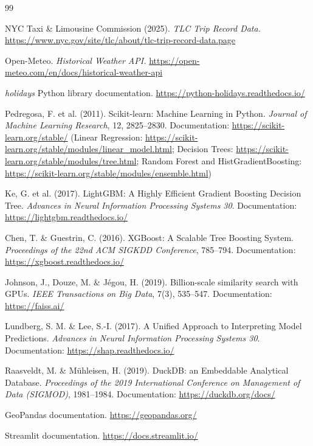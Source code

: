 \documentclass[12pt,a4paper]{article}
\begin{document}
\begin{thebibliography}{99}

 NYC Taxi \& Limousine Commission (2025). \emph{TLC Trip Record Data.} \url{https://www.nyc.gov/site/tlc/about/tlc-trip-record-data.page}

 Open-Meteo. \emph{Historical Weather API.} \url{https://open-meteo.com/en/docs/historical-weather-api}

 \emph{holidays} Python library documentation. \url{https://python-holidays.readthedocs.io/}

 Pedregosa, F. et al. (2011). Scikit-learn: Machine Learning in Python. \emph{Journal of Machine Learning Research}, 12, 2825--2830. Documentation: \url{https://scikit-learn.org/stable/} (Linear Regression: \url{https://scikit-learn.org/stable/modules/linear_model.html}; Decision Trees: \url{https://scikit-learn.org/stable/modules/tree.html}; Random Forest and HistGradientBoosting: \url{https://scikit-learn.org/stable/modules/ensemble.html})

 Ke, G. et al. (2017). LightGBM: A Highly Efficient Gradient Boosting Decision Tree. \emph{Advances in Neural Information Processing Systems 30}. Documentation: \url{https://lightgbm.readthedocs.io/}

 Chen, T. \& Guestrin, C. (2016). XGBoost: A Scalable Tree Boosting System. \emph{Proceedings of the 22nd ACM SIGKDD Conference}, 785--794. Documentation: \url{https://xgboost.readthedocs.io/}

 Johnson, J., Douze, M. \& J\'egou, H. (2019). Billion-scale similarity search with GPUs. \emph{IEEE Transactions on Big Data}, 7(3), 535--547. Documentation: \url{https://faiss.ai/}

 Lundberg, S. M. \& Lee, S.-I. (2017). A Unified Approach to Interpreting Model Predictions. \emph{Advances in Neural Information Processing Systems 30}. Documentation: \url{https://shap.readthedocs.io/}

 Raasveldt, M. \& M\"uhleisen, H. (2019). DuckDB: an Embeddable Analytical Database. \emph{Proceedings of the 2019 International Conference on Management of Data (SIGMOD)}, 1981--1984. Documentation: \url{https://duckdb.org/docs/}

 GeoPandas documentation. \url{https://geopandas.org/}

 Streamlit documentation. \url{https://docs.streamlit.io/}

\end{thebibliography}
\end{document}
